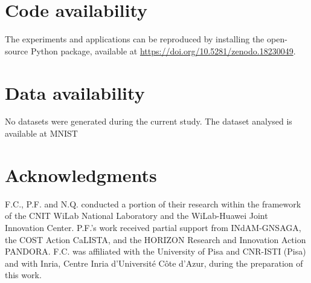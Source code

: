 \documentclass[11pt]{article}
\begin{document}

\section*{Code availability}
The experiments and applications can be reproduced by installing the open-source Python package, available at \url{https://doi.org/10.5281/zenodo.18230049}.

\section*{Data availability}
No datasets were generated during the current study. The dataset analysed is available at
MNIST~\cite{lecun1998mnist}

\section*{Acknowledgments}
F.C., P.F. and N.Q. conducted a portion of their research within the framework of the CNIT WiLab National Laboratory and the WiLab-Huawei Joint Innovation Center. P.F.'s work received partial support from INdAM-GNSAGA, the COST Action CaLISTA, and the HORIZON Research and Innovation Action PANDORA. F.C. was affiliated with the University of Pisa and CNR-ISTI (Pisa) and with Inria, Centre Inria d'Université Côte d'Azur, during the preparation of this work.



\end{document}
